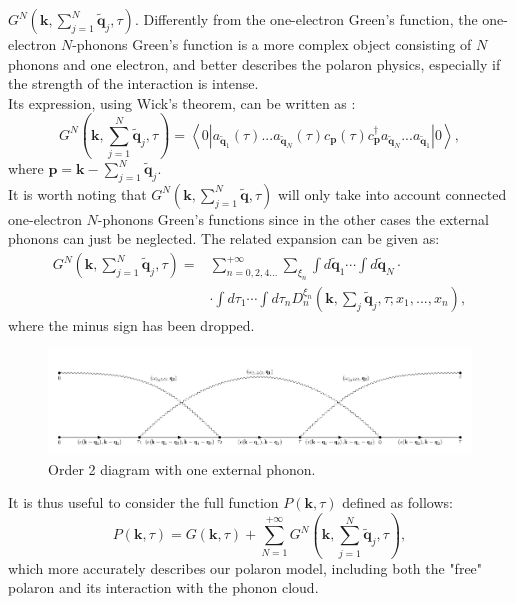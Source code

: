 $G^N(\mathbf{k},\sum_{j=1}^N\mathbf{\tilde{q}}_j,\tau)$. Differently from the one-electron Green's function, the one-electron $N$-phonons Green's function is a more complex object consisting of 
$N$ phonons and one electron, and better describes the polaron physics, especially if the strength of the interaction is intense.\\
Its expression, using Wick's theorem, can be written as \cite{hahn2018diagrammatic}:
\begin{equation}
    G^N(\mathbf{k},\sum_{j=1}^N\mathbf{\tilde{q}}_j,\tau)=\left\langle 0|a_{\mathbf{\tilde{q}}_1}(\tau)...a_{\mathbf{\tilde{q}}_N}(\tau)c_{\mathbf{p}}(\tau)c^\dagger_{\mathbf{p}}a_{\mathbf{\tilde{q}}_N}...a_{\mathbf{\tilde{q}}_1} |0\right\rangle,
\end{equation}
where $\mathbf{p}=\mathbf{k}-\sum_{j=1}^N\mathbf{\tilde{q}}_j$.\\
It is worth noting that $G^N(\mathbf{k},\sum_{j=1}^N\mathbf{\tilde{q}},\tau)$ will only take into account connected one-electron $N$-phonons Green's functions since in the other cases the external 
phonons can just be neglected. The related expansion can be given as:
\begin{equation}
\begin{split}
        G^N(\mathbf{k},\sum_{j=1}^N\mathbf{\tilde{q}}_j,\tau)=&\sum_{n=0,2,4...}^{+\infty}\sum_{\xi_n}\int d\mathbf{\tilde{q}}_1\cdots \int d\mathbf{\tilde{q}}_N \cdot \\
         &\cdot\int d\tau_1\cdots\int d\tau_n D_n^{\xi_n}(\mathbf{k},\sum_j\mathbf{\tilde{q}}_j,\tau;x_1,...,x_n),
\end{split}
\label{GF_N_polaron_series}
\end{equation}
where the minus sign has been dropped.
\begin{figure}[H]
    \centering
    \includegraphics[scale = 0.55]{diagram_order_2_N2.pdf}
    \caption{Order 2 diagram with one external phonon.}
    \label{fig:diagram_order_2_N2}
\end{figure}
It is thus useful to consider the full function $P(\mathbf{k},\tau)$ defined as follows:
\begin{equation}
    P(\mathbf{k},\tau)=G(\mathbf{k},\tau)+\sum_{N=1}^{+\infty}G^N(\mathbf{k},\sum_{j=1}^N\mathbf{\tilde{q}}_j,\tau),
\end{equation}
which more accurately describes our polaron model, including both the "free" polaron and its interaction with the phonon cloud.
